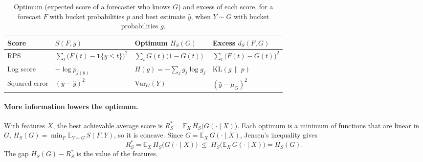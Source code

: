 \documentclass{article}
\newcommand{\1}{\mathbf{1}}
\newcommand{\E}{\mathbb{E}}
\begin{document}
\begin{table}[h]
\centering
\caption{Optimum (expected score of a forecaster who knows $G$) and excess of each score, for a forecast $F$ with bucket probabilities $p$ and best estimate $\hat y$, when $Y \sim G$ with bucket probabilities $g$.}
\label{tab:entropy}
\begin{tabular}{llll}
\toprule
Score & $S(F, y)$ & Optimum $H_S(G)$ & Excess $d_S(F, G)$ \\
\midrule
RPS & $\sum_t \big(F(t) - \1\{y \le t\}\big)^2$ & $\sum_t G(t)\big(1 - G(t)\big)$ & $\sum_t \big(F(t) - G(t)\big)^2$ \\
Log score & $-\log p_{j(y)}$ & $H(g) = -\sum_j g_j \log g_j$ & $\mathrm{KL}(g \,\|\, p)$ \\
Squared error & $(y - \hat y)^2$ & $\mathrm{Var}_G(Y)$ & $(\hat y - \mu_G)^2$ \\
\bottomrule
\end{tabular}
\end{table}

\paragraph{More information lowers the optimum.} With features $X$, the best achievable average score is $R_S^* = \E_X\, H_S\big(G(\cdot \mid X)\big)$. Each optimum is a minimum of functions that are linear in $G$, $H_S(G) = \min_F \E_{Y \sim G}\, S(F, Y)$, so it is concave. Since $G = \E_X\, G(\cdot \mid X)$, Jensen's inequality gives
\begin{equation}\label{eq:jensen}
R_S^* = \E_X\, H_S\big(G(\cdot \mid X)\big) \;\le\; H_S\big(\E_X\, G(\cdot \mid X)\big) = H_S(G).
\end{equation}
The gap $H_S(G) - R_S^*$ is the value of the features.
\end{document}
